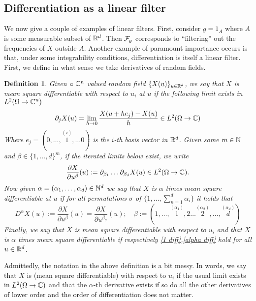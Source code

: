 \documentclass[12pt]{article}
\newtheorem{definition}{Definition}
\begin{document}
\subsection{Differentiation as a linear filter}
We now give a couple of examples of linear filters. First, consider $g=1_A$ where  $A$ is some measurable subset of  ${\mathbb R}^d$. Then $\mathcal{F}_g$ corresponds to ``filtering'' out the frequencies of $X$ outside  $A$. Another example of paramount importance occurs is that, under some integrability conditions, differentiation is itself a linear filter. First, we define in what sense we take derivatives of random fields.
\begin{definition}
	Given a $\mathbb{C}^n$ valued random field $\{X(u)\}_{u\in{\mathbb R}^d}$, we say that \emph{$X$ is mean square differentiable with respect to $u_i$ at $u$} if the following limit exists in $L^2(\Omega\to\mathbb{C}^n)$
	\begin{equation}\label{1 diff}
		\partial_j X(u)=\lim_{h \to 0}\frac{X(u+he_j)-X(u)}{h}\in L^2(\Omega\to\mathbb{C})
	\end{equation}
	Where $e_j=(0,\ldots,\overset{(i)}{1},\ldots 0)$ is the $i$-th basis vector in  ${\mathbb R}^d$.
	Given some $m\in \mathbb{N}$ and $\beta\in\{1,\ldots,d\}^m$, if the iterated limits below exist, we write
	\begin{equation*}
		\frac{\partial X}{\partial u^\beta}(u):=\partial _{\beta_1}\ldots \partial _{\beta_d}X(u)\in L^2(\Omega\to\mathbb{C}) .
	\end{equation*}
	Now given $\alpha=(\alpha_1,\ldots,\alpha_d)\in \mathbb{N}^d$    we say that \emph{$X$ is  $\alpha$ times mean square differentiable at $u$} if for all permutations $\sigma$ of $\{1,\ldots,\sum_{n=1}^{d}\alpha_i\}$ it holds that
	\begin{equation}\label{alpha diff}
		D^\alpha X(u):=\frac{\partial X}{\partial u^\beta}(u)= \frac{\partial X}{\partial u^{\beta_\sigma}}(u);\quad \beta:=(1,\ldots,\overset{(\alpha_1)}{1},2\ldots \overset{(\alpha_2)}{2},\ldots,\overset{(\alpha_d)}{d})
	\end{equation}
	Finally, we say that \emph{$X$ is mean square differentiable with respect to $u_i$} and that \emph{ $X$ is $\alpha$ times mean square differentiable} if respectively \eqref{1 diff},\eqref{alpha diff}  hold for all $u\in {\mathbb R}^d$.
\end{definition}
Admittedly, the notation in the above definition is a bit messy. In words, we say that $X$ is (mean square differentiable) with respect to  $u_i$ if the usual limit exists in  $L^2(\Omega\to\mathbb{C})$ and that the $\alpha$-th derivative exists if so do all the other derivatives of lower order and the order of differentiation does not matter.\\
\end{document}
